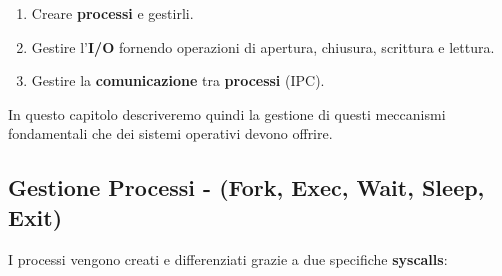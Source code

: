 \documentclass{article}
\begin{document}
\begin{enumerate}
    \item Creare \textbf{processi} e gestirli.
    \item Gestire l'\textbf{I/O} fornendo operazioni di apertura, chiusura, scrittura e lettura.
    \item Gestire la \textbf{comunicazione} tra \textbf{processi} (IPC).
\end{enumerate}

In questo capitolo descriveremo quindi la gestione di questi meccanismi fondamentali che dei sistemi operativi devono offrire.

\subsection{Gestione Processi - (Fork, Exec, Wait, Sleep, Exit)}

I processi vengono creati e differenziati grazie a due specifiche \textbf{syscalls}:
\end{document}
